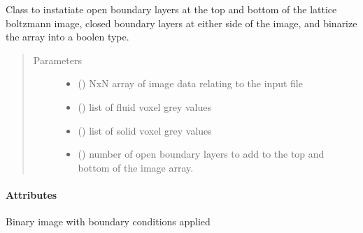 \documentclass[letterpaper,10pt,english]{sphinxmanual}
\begin{document}
\begin{fulllineitems}
\label{\detokenize{index:lb_colloids.LB.LB_2Dimage.BoundaryCondition}}
Class to instatiate open boundary layers at the top and bottom of the
lattice boltzmann image, closed boundary layers at either side of the
image, and binarize the array into a boolen type.
\begin{quote}\begin{description}
\item[{Parameters}] \leavevmode\begin{itemize}
\item {} 
 () \textendash{} NxN array of image data relating to the input file

\item {} 
 () \textendash{} list of fluid voxel grey values

\item {} 
 () \textendash{} list of solid voxel grey values

\item {} 
 () \textendash{} number of open boundary layers to add to the top and
bottom of the image array.

\end{itemize}

\end{description}\end{quote}
\paragraph{Attributes}

\begin{fulllineitems}
\label{\detokenize{index:lb_colloids.LB.LB_2Dimage.BoundaryCondition.binarized}}
 \textendash{} Binary image with boundary conditions applied

\end{fulllineitems}


\end{fulllineitems}
\end{document}
